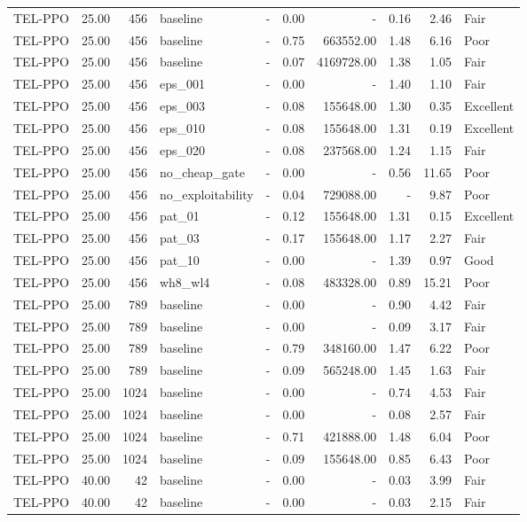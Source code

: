 \begin{table}[htbp]
\begin{tabular}{lrrlrrrrrl}
TEL-PPO & 25.00 & 456 & baseline & - & 0.00 & - & 0.16 & 2.46 & Fair \\
TEL-PPO & 25.00 & 456 & baseline & - & 0.75 & 663552.00 & 1.48 & 6.16 & Poor \\
TEL-PPO & 25.00 & 456 & baseline & - & 0.07 & 4169728.00 & 1.38 & 1.05 & Fair \\
TEL-PPO & 25.00 & 456 & eps_001 & - & 0.00 & - & 1.40 & 1.10 & Fair \\
TEL-PPO & 25.00 & 456 & eps_003 & - & 0.08 & 155648.00 & 1.30 & 0.35 & Excellent \\
TEL-PPO & 25.00 & 456 & eps_010 & - & 0.08 & 155648.00 & 1.31 & 0.19 & Excellent \\
TEL-PPO & 25.00 & 456 & eps_020 & - & 0.08 & 237568.00 & 1.24 & 1.15 & Fair \\
TEL-PPO & 25.00 & 456 & no_cheap_gate & - & 0.00 & - & 0.56 & 11.65 & Poor \\
TEL-PPO & 25.00 & 456 & no_exploitability & - & 0.04 & 729088.00 & - & 9.87 & Poor \\
TEL-PPO & 25.00 & 456 & pat_01 & - & 0.12 & 155648.00 & 1.31 & 0.15 & Excellent \\
TEL-PPO & 25.00 & 456 & pat_03 & - & 0.17 & 155648.00 & 1.17 & 2.27 & Fair \\
TEL-PPO & 25.00 & 456 & pat_10 & - & 0.00 & - & 1.39 & 0.97 & Good \\
TEL-PPO & 25.00 & 456 & wh8_wl4 & - & 0.08 & 483328.00 & 0.89 & 15.21 & Poor \\
TEL-PPO & 25.00 & 789 & baseline & - & 0.00 & - & 0.90 & 4.42 & Fair \\
TEL-PPO & 25.00 & 789 & baseline & - & 0.00 & - & 0.09 & 3.17 & Fair \\
TEL-PPO & 25.00 & 789 & baseline & - & 0.79 & 348160.00 & 1.47 & 6.22 & Poor \\
TEL-PPO & 25.00 & 789 & baseline & - & 0.09 & 565248.00 & 1.45 & 1.63 & Fair \\
TEL-PPO & 25.00 & 1024 & baseline & - & 0.00 & - & 0.74 & 4.53 & Fair \\
TEL-PPO & 25.00 & 1024 & baseline & - & 0.00 & - & 0.08 & 2.57 & Fair \\
TEL-PPO & 25.00 & 1024 & baseline & - & 0.71 & 421888.00 & 1.48 & 6.04 & Poor \\
TEL-PPO & 25.00 & 1024 & baseline & - & 0.09 & 155648.00 & 0.85 & 6.43 & Poor \\
TEL-PPO & 40.00 & 42 & baseline & - & 0.00 & - & 0.03 & 3.99 & Fair \\
TEL-PPO & 40.00 & 42 & baseline & - & 0.00 & - & 0.03 & 2.15 & Fair \\

\end{tabular}
\end{table}
